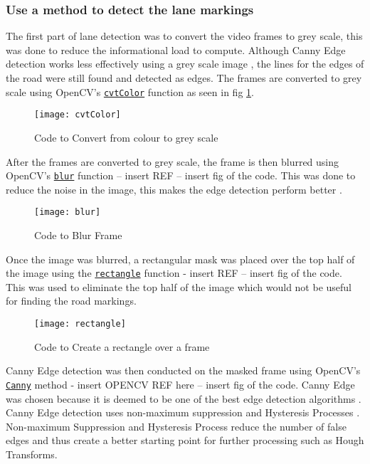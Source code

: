 \documentclass[conference]{IEEEtran}
\begin{document}
\subsubsection{Use a method to detect the lane markings}

The first part of lane detection was to convert the video frames to grey scale, this was done to reduce the informational load to compute. Although Canny Edge detection works less effectively using a grey scale image \cite{Canny_On_Grey}, the lines for the edges of the road were still found and detected as edges. The frames are converted to grey scale using OpenCV's \href{https://docs.opencv.org/4.x/d8/d01/group__imgproc__color__conversions.html#ga397ae87e1288a81d2363b61574eb8cab}{\texttt{cvtColor}} function as seen in fig \ref{fig:cvtColor}.

\begin{figure}[H]
\centerline{\texttt{[image: cvtColor]}}
\caption{Code to Convert from colour to grey scale}
\label{fig:cvtColor}
\end{figure}

After the frames are converted to grey scale, the frame is then blurred using OpenCV's \href{https://docs.opencv.org/4.x/d4/d86/group__imgproc__filter.html#ga8c45db9afe636703801b0b2e440fce37}{\texttt{blur}} function -- insert REF -- insert fig of the code. This was done to reduce the noise in the image, this makes the edge detection perform better \cite{Image_Blurring}.

\begin{figure}[H]
\centerline{\texttt{[image: blur]}}
\caption{Code to Blur Frame}
\label{fig:blur}
\end{figure} 

Once the  image was blurred, a rectangular mask was placed over the top half of the image using the \href{https://docs.opencv.org/4.x/d6/d6e/group__imgproc__draw.html#ga07d2f74cadcf8e305e810ce8eed13bc9}{\texttt{rectangle}} function - insert REF -- insert fig of the code. This was used to eliminate the top half of the image which would not be useful for finding the road markings. 

\begin{figure}[H]
\centerline{\texttt{[image: rectangle]}}
\caption{Code to Create a rectangle over a frame}
\label{fig:rectangle}
\end{figure}
 
Canny Edge detection was then conducted on the masked frame using OpenCV's \href{https://docs.opencv.org/4.x/dd/d1a/group__imgproc__feature.html#ga04723e007ed888ddf11d9ba04e2232de}{\texttt{Canny}} method - insert OPENCV REF here -- insert fig of the code. Canny Edge was chosen because it is deemed to be one of the best edge detection algorithms \cite{Canny2009CannyED}. Canny Edge detection uses non-maximum suppression \cite{non-maximum_supression} and Hysteresis Processes \cite{Hysteresis_Thresholding}. Non-maximum Suppression and Hysteresis Process reduce the number of false edges and thus create a better starting point for further processing such as Hough Transforms. 
\end{document}
